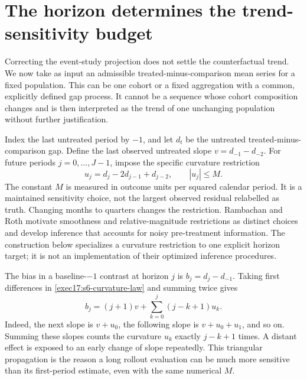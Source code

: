 \section{The horizon determines the trend-sensitivity budget}
\label{exec17:s6-curvature}

Correcting the event-study projection does not settle the counterfactual
trend. We now take as input an admissible treated-minus-comparison mean
series for a fixed population. This can be one cohort or a fixed aggregation
with a common, explicitly defined gap process. It cannot be a sequence whose
cohort composition changes and is then interpreted as the trend of one
unchanging population without further justification.

Index the last untreated period by $-1$, and let $d_t$ be the untreated
treated-minus-comparison gap. Define the last observed untreated slope
$v=d_{-1}-d_{-2}$. For future periods $j=0,\ldots,J-1$, impose the
specific curvature restriction
\begin{equation}
 u_j=d_j-2d_{j-1}+d_{j-2},\qquad |u_j|\leq M.
 \label{exec17:s6-curvature-law}
\end{equation}
The constant $M$ is measured in outcome units per squared calendar period.
It is a maintained sensitivity choice, not the largest observed residual
relabelled as truth. Changing months to quarters changes the restriction.
Rambachan and Roth motivate smoothness and relative-magnitude restrictions
as distinct choices and develop inference that accounts for noisy
pre-treatment information. The construction below specializes a curvature
restriction to one explicit horizon target; it is not an implementation of
their optimized inference procedures.\citep{rambachan2023}

The bias in a baseline-$-1$ contrast at horizon $j$ is
$b_j=d_j-d_{-1}$. Taking first differences in
\eqref{exec17:s6-curvature-law} and summing twice gives
\begin{equation}
 b_j=(j+1)v+\sum_{k=0}^{j}(j-k+1)u_k.
 \label{exec17:s6-triangular}
\end{equation}
Indeed, the next slope is $v+u_0$, the following slope is
$v+u_0+u_1$, and so on. Summing these slopes counts the curvature
$u_k$ exactly $j-k+1$ times. A distant effect is exposed to an early
change of slope repeatedly. This triangular propagation is the reason a
long rollout evaluation can be much more sensitive than its first-period
estimate, even with the same numerical $M$.

